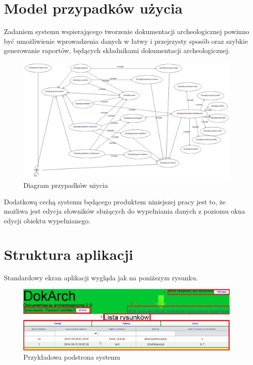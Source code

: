 \section{Model przypadków użycia}
Zadaniem systemu wspierającego tworzenie dokumentacji archeologicznej powinno być umożliwienie wprowadzenia danych w łatwy i przejrzysty sposób oraz szybkie generowanie raportów, będących składnikami dokumentacji archeologicznej.

\begin{figure} [H]
    \begin{center}
	\includegraphics[angle=90, scale=.35]{img/useCasesData.png}
	\caption{Diagram przypadków użycia}
	\label{useCasesDiag}
    \end{center}
\end{figure}

Dodatkową cechą systemu będącego produktem niniejszej pracy jest to, że możliwa jest edycja słowników służących do wypełniania danych z poziomu okna edycji obiektu wypełnianego.
\newpage
\section{Struktura aplikacji}

Standardowy ekran aplikacji wygląda jak na poniższym rysunku.

\begin{figure} [H]
    \begin{center}
	\includegraphics[scale=.6]{img/strona.png}
	\caption{Przykładowa podstrona systemu}
	\label{stronaPrzyklad}
    \end{center}
\end{figure}

